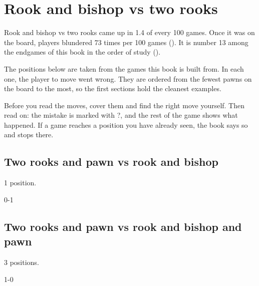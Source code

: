 \chapter{Rook and bishop vs two rooks}\label{ch:rook-and-bishop-vs-two-rooks}
Rook and bishop vs two rooks came up in 1.4 of every 100 games. Once it was on the board, players blundered 73 times per 100 games (). It is number 13 among the endgames of this book in the order of study ().

The positions below are taken from the games this book is built from. In each one, the player to move went wrong. They are ordered from the fewest pawns on the board to the most, so the first sections hold the cleanest examples.

Before you read the moves, cover them and find the right move yourself. Then read on: the mistake is marked with ?, and the rest of the game shows what happened. If a game reaches a position you have already seen, the book says so and stops there.


\section{Two rooks and pawn vs rook and bishop}
1 position.


0-1\par
\section{Two rooks and pawn vs rook and bishop and pawn}
3 positions.


1-0\par
{}

